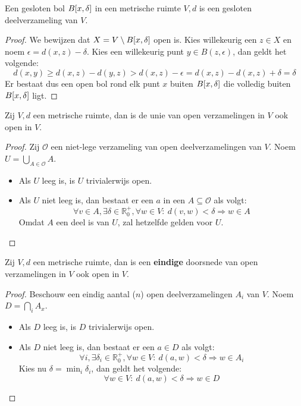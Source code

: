 \documentclass[main.tex]{subfiles}
\begin{document}
\begin{st}
  Een gesloten bol $B\interval{x}{\delta}$ in een metrische ruimte $V,d$ is een gesloten deelverzameling van $V$.

  \begin{proof}
    We bewijzen dat $X = V \setminus B\interval{x}{\delta}$ open is.
    Kies willekeurig een $z\in X$ en noem $\epsilon = d(x,z) - \delta$.
    Kies een willekeurig punt $y\in B(z,\epsilon)$, dan geldt het volgende:
    \[ d(x,y) \ge d(x,z) - d(y,z) > d(x,z) - \epsilon = d(x,z) -d(x,z) + \delta = \delta \]
    Er bestaat dus een open bol rond elk punt $x$ buiten $B\interval{x}{\delta}$ die volledig buiten $B\interval{x}{\delta}$ ligt.
  \end{proof}
\end{st}



\begin{pr}
  Zij $V,d$ een metrische ruimte, dan is de unie van open verzamelingen in $V$ ook open in $V$.

  \begin{proof}
    Zij $\mathcal{O}$ een niet-lege verzameling van open deelverzamelingen van $V$.
    Noem $U = \bigcup_{A\in \mathcal{O}}A$.
    \begin{itemize}
    \item Als $U$ leeg is, is $U$ trivialerwijs open.
    \item Als $U$ niet leeg is, dan bestaat er een $a$ in een $A \subseteq \mathcal{O}$ als volgt:
      \[ \forall v\in A, \exists \delta \in \mathbb{R}_{0}^{+}, \forall w\in V:\ d(v,w) < \delta \Rightarrow w \in A \]
      Omdat $A$ een deel is van $U$, zal hetzelfde gelden voor $U$.
    \end{itemize}
  \end{proof}
\end{pr}

\begin{pr}
  Zij $V,d$ een metrische ruimte, dan is een \textbf{eindige} doorsnede van open verzamelingen in $V$ ook open in $V$.
  
  \begin{proof}
    Beschouw een eindig aantal ($n$) open deelverzamelingen $A_{i}$ van $V$.
    Noem $D = \bigcap_{i}A_{x}$.
    \begin{itemize}
    \item Als $D$ leeg is, is $D$ trivialerwijs open.
    \item Als $D$ niet leeg is, dan bestaat er een $a\in D$ als volgt:
      \[ \forall i, \exists \delta_{i} \in \mathbb{R}_{0}^{+}, \forall w\in V:\ d(a,w) < \delta \Rightarrow w \in A_{i} \]
      Kies nu $\delta = \min_{i}\delta_{i}$, dan geldt het volgende:
      \[ \forall w\in V:\ d(a,w) < \delta \Rightarrow w\in D \]
    \end{itemize}
  \end{proof}
\end{pr}
\end{document}
